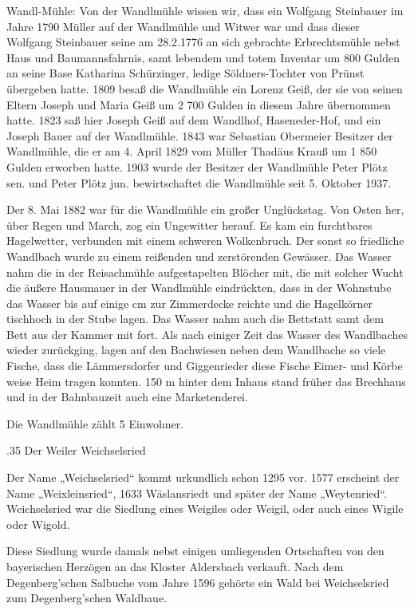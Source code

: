 \documentclass{book}
\begin{document}
Wandl-Mühle: Von der Wandlmühle wissen wir, dass ein Wolfgang Steinbauer im
Jahre 1790 Müller auf der Wandlmühle und Witwer war und dass dieser Wolfgang
Steinbauer seine am 28.2.1776 an sich gebrachte Erbrechtsmühle nebst Haus und
Baumannsfahrnis, samt lebendem und totem Inventar um 800 Gulden an seine Base
Katharina Schürzinger, ledige Söldners-Tochter von Prünst übergeben hatte. 1809
besaß die Wandlmühle ein Lorenz Geiß, der sie von seinen Eltern Joseph und Maria
Geiß um 2 700 Gulden in diesem Jahre übernommen hatte. 1823 saß hier Joseph Geiß
auf dem Wandlhof, Haseneder-Hof, und ein Joseph Bauer auf der Wandlmühle. 1843
war Sebastian Obermeier Besitzer der Wandlmühle, die er am 4. April 1829 vom
Müller Thadäus Krauß um 1 850 Gulden erworben hatte. 1903 wurde der Besitzer der
Wandlmühle Peter Plötz sen. und Peter Plötz jun. bewirtschaftet die Wandlmühle
seit 5. Oktober 1937.

Der 8. Mai 1882 war für die Wandlmühle ein großer Unglückstag. Von Osten her,
über Regen und March, zog ein Ungewitter herauf. Es kam ein furchtbares
Hagelwetter, verbunden mit einem schweren Wolkenbruch. Der sonst so friedliche
Wandlbach wurde zu einem reißenden und zerstörenden Gewässer. Das Wasser nahm
die in der Reisachmühle aufgestapelten Blöcher mit, die mit solcher Wucht die
äußere Hausmauer in der Wandlmühle eindrückten, dass in der Wohnstube das Wasser
bis auf einige cm zur Zimmerdecke reichte und die Hagelkörner tischhoch in der
Stube lagen. Das Wasser nahm auch die Bettstatt samt dem Bett aus der Kammer mit
fort. Als nach einiger Zeit das Wasser des Wandlbaches wieder zurückging, lagen
auf den Bachwiesen neben dem Wandlbache so viele Fische, dass die Lämmersdorfer
und Giggenrieder diese Fische Eimer- und Körbe weise Heim tragen konnten. 150 m
hinter dem Inhaus stand früher das Brechhaus und in der Bahnbauzeit auch eine
Marketenderei.

Die Wandlmühle zählt 5 Einwohner.

.35 Der Weiler Weichselsried

Der Name „Weichselsried“ kommt urkundlich schon 1295 vor. 1577 erscheint der
Name „Weixleinsried“, 1633 Wäslansriedt und später der Name „Weytenried“.
Weichselsried war die Siedlung eines Weigiles oder Weigil, oder auch eines
Wigile oder Wigold.

Diese Siedlung wurde damals nebst einigen umliegenden Ortschaften von den
bayerischen Herzögen an das Kloster Aldersbach verkauft. Nach dem
Degenberg'schen Salbuche vom Jahre 1596 gehörte ein Wald bei Weichselsried zum
Degenberg'schen Waldbaue.
\end{document}
